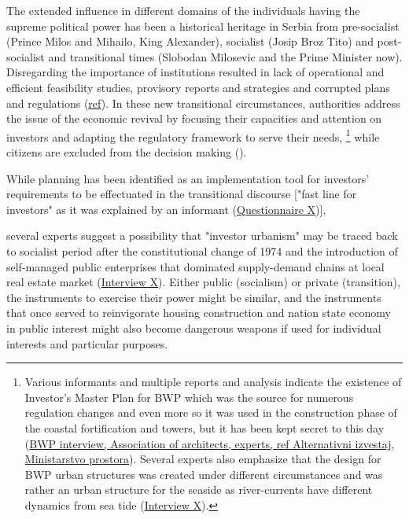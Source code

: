 \documentclass[11pt]{report}
\begin{document}
\begin{itemize}
The extended influence in different domains of the individuals having the supreme political power has been a historical heritage in Serbia from pre-socialist (Prince Milos and Mihailo, King Alexander), socialist (Josip Broz Tito) and post-socialist and transitional times (Slobodan Milosevic and the Prime Minister now).
Disregarding the importance of institutions resulted in lack of operational and efficient feasibility studies, provisory reports and strategies and corrupted plans and regulations (\href{ref}{ref}).
In these new transitional circumstances, authorities address the issue of the economic revival by focusing their capacities and attention on investors and adapting the regulatory framework to serve their needs,
\footnote{Various informants and multiple reports and analysis indicate the existence of Investor's Master Plan for BWP which was the source for numerous regulation changes and even more so it was used in the construction phase of the coastal fortification and towers, but it has been kept secret to this day (\href{ref}{BWP interview, Association of architects, experts, ref Alternativni izvestaj, Ministarstvo prostora}).
Several experts also emphasize that the design for BWP urban structures was created under different circumstances and was rather an urban structure for the seaside as river-currents have different dynamics from sea tide (\href{InterviewX}{Interview X}).}
while citizens are excluded from the decision making (\href{ref}{\citealt{ministarstvo_prostora_urbani_2014}}).

While planning has been identified as an implementation tool for investors' requirements to be effectuated in the transitional discourse ["fast line for investors" as it was explained by an informant (\href{Questionnaire Experts Post-socialist}{Questionnaire X})],

several experts suggest a possibility that "investor urbanism" may be traced back to socialist period after the constitutional change of 1974 and the introduction of self-managed public enterprises that dominated supply-demand chains at local real estate market (\href{InterviewX}{Interview X}).
Either public (socialism) or private (transition), the instruments to exercise their power might be similar, and the instruments that once served to reinvigorate housing construction and nation state economy in public interest might also become dangerous weapons if used for individual interests and particular purposes.


\end{itemize}
\end{document}
